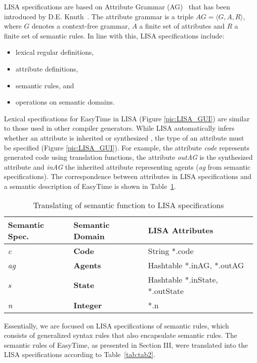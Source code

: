 \documentclass[preprint, prX]{revtex4}
\begin{document}
LISA specifications are based on Attribute Grammar (AG)~\cite{Paakki:1995} that has been introduced by D.E. Knuth~\cite{Knuth:1968}.
The attribute grammar is a triple $AG=\langle G,A,R \rangle$, where $G$ denotes a context-free grammar, $A$ a finite set of attributes
and $R$ a finite set of semantic rules. In line with this, LISA specifications include:
\begin{itemize}
  \item lexical regular definitions,
  \item attribute definitions,
  \item semantic rules, and
  \item operations on semantic domains.
\end{itemize}

Lexical specifications for EasyTime in LISA (Figure \ref{pic:LISA_GUI}) are similar to those used in other compiler generators.
While LISA automatically infers whether an attribute is inherited or synthesized \cite{Knuth:1968}, the type of an attribute must
be specified (Figure \ref{pic:LISA_GUI}). For example, the attribute \textit{code} represents generated code using translation
functions, the attribute \textit{outAG} is the synthesized attribute and \textit{inAG} the inherited attribute representing agents (\textit{ag} from semantic specifications). The correspondence between attributes in LISA specifications and a semantic description of
EasyTime is shown in Table~\ref{tab:W}.


\begin{table}[htb]
\caption{Translating of semantic function to LISA specifications}
\label{tab:W}
\vspace{-5mm}
\begin{center}
\begin{tabular}{ l l l }
\hline
 Semantic Spec. & Semantic Domain & LISA Attributes \\
\hline
 \textit{c} & \textbf{Code} & String *.code \\
 \textit{ag} & \textbf{Agents} & Hashtable *.inAG, *.outAG \\
 \textit{s} & \textbf{State} & Hashtable *.inState, *.outState \\
 \textit{n} & \textbf{Integer}& *.n  \\
\hline
\end{tabular}
\end{center}
\vspace{-5mm}
\end{table}

Essentially, we are focused on LISA specifications of semantic rules, which consists of generalized syntax rules that also encapsulate
semantic rules. The semantic rules of EasyTime, as presented in Section III, were translated into the LISA specifications according to
Table~\ref{tab:tab2}.
\end{document}
